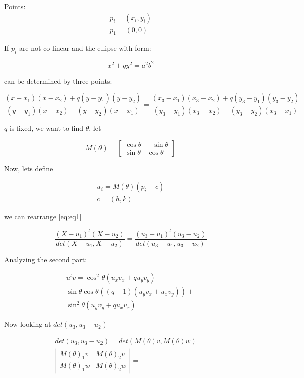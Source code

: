 \documentclass{article}
\begin{document}
	Points:
\begin{equation}
\begin{split}
	p_i = (x_i, y_i)\\
	p_1 = (0,0)
\end{split}
\end{equation}

If $p_i$ are not co-linear and the ellipse with form:

\begin{equation}
x^2 + qy^2 = a^2b^2
\end{equation}

can be determined by three points:

\begin{equation}\label{eq:eq1}
\dfrac{(x-x_1)(x - x_2) + q(y-y_1)(y-y_2)}{(y-y_1)(x-x_2)-(y-y_2)(x-x_1)} = 	\dfrac{(x_3-x_1)(x_3 - x_2) + q(y_3-y_1)(y_3-y_2)}{(y_3-y_1)(x_3-x_2)-(y_3-y_2)(x_3-x_1)}
\end{equation}

$q$ is fixed, we want to find $\theta$, let

\begin{equation}
M(\theta) = \left[\begin{array}{cc} \cos{\theta} & -\sin{\theta}\\ \sin{\theta} & \cos{\theta}\end{array}\right]
\end{equation}

Now, lets define

\begin{eqnarray}
u_i = M(\theta)(p_i-c)\\
c=(h,k)
\end{eqnarray}

we can rearrange \ref{eq:eq1}

\begin{equation}
\dfrac{(X-u_1)^t(X-u_2)}{det(X-u_1, X-u_2)} = \dfrac{(u_3-u_1)^t(u_3-u_2)}{det(u_3-u_1, u_3-u_2)}
\end{equation}

Analyzing the second part:

\begin{align*}
u^tv = \cos^2{\theta}(u_xv_x + qu_yv_y)+\\
\sin{\theta}\cos{\theta}((q-1)(u_yv_x+u_xv_y))+\\
\sin^2{\theta}(u_yv_y + qu_xv_x)
\end{align*}

Now looking at $det(u_3, u_3-u_2)$

\begin{equation}
\begin{split}
det(u_3, u_3-u_2) = det(M(\theta)v, M(\theta)w)=\\
\left|\begin{array}{cc}M(\theta)_1 v & M(\theta)_2v\\ M(\theta)_1 w & M(\theta)_2w\end{array}\right|=
\end{split}
\end{equation}
\end{document}
